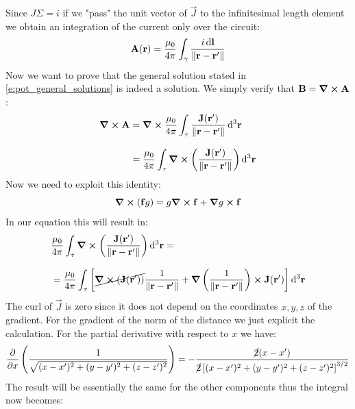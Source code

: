 Since $J\Sigma = i$ if we "pass" the unit vector of $\vec{J}$ to the infinitesimal length element we obtain an integration of the current only over the circuit:
\begin{equation}
  \vb{A}(\vb{r}) = \dfrac{\mu_0}{4 \pi }\int_{\gamma} \dfrac{i \dd{\vb{l}}}{\norm{\vb{r}-\vb{r}'}}
\end{equation}
Now we want to prove that the general solution stated in \eqref{e:pot_general_solutions} is indeed a solution. We simply verify that $\vb{B} = \curl{\vb{A}}$:
\begin{equation}
  \begin{split}
    \curl{\vb{A}} &= \curl \dfrac{\mu_0}{4 \pi }\int_{\tau} \dfrac{\vb{J} (\vb{r}')}{\norm{\vb{r}-\vb{r}'}}\dd{^3 \vb{r}} \\[8pt]
    &=  \dfrac{\mu_0}{4 \pi }\int_{\tau} \curl{\left(\dfrac{\vb{J} (\vb{r}')}{\norm{\vb{r}-\vb{r}'}}\right)} \dd{^3 \vb{r}}
  \end{split}
\end{equation}
Now we need to exploit this identity:
\begin{equation}
  \curl{\left(\vb{f}g\right)} = g\curl{\vb{f}} + \grad{g} \cross \vb{f}
\end{equation}
In our equation this will result in:
\begin{equation}
  \begin{split}
    &\dfrac{\mu_0}{4 \pi }\int_{\tau} \curl{\left(\dfrac{\vb{J} (\vb{r}')}{\norm{\vb{r}-\vb{r}'}}\right)} \dd{^3 \vb{r}} = \\[8pt]
    &= \dfrac{\mu_0}{4 \pi }\int_{\tau}\left[ \cancel{\curl{\left(\vb{J}(\vb{r}')\right)}}\dfrac{1}{\norm{\vb{r}-\vb{r}'}}  + \grad{\left(\dfrac{1}{\norm{\vb{r}-\vb{r}'}}\right)} \cross \vb{J}(\vb{r}')\right]\dd{^3 \vb{r}}
  \end{split}
\end{equation}
The curl of $\vec{J}$ is zero since it does not depend on the coordinates $x,y,z$ of the gradient. For the gradient of the norm of the distance we just explicit the calculation. For the partial derivative with respect to $x$ we have:
\begin{equation}
  \begin{split}
    \pdv{}{x}\brackets{\dfrac{1}{\sqrt{(x-x')^2 + (y-y')^2 + (z-z')^2}}} = -\dfrac{\cancel{2}(x-x')}{\cancel{2}\left[(x-x')^2 + (y-y')^2 + (z-z')^2\right]^{3/2}}
  \end{split}
\end{equation}
The result will be essentially the same for the other components thus the integral now becomes:
